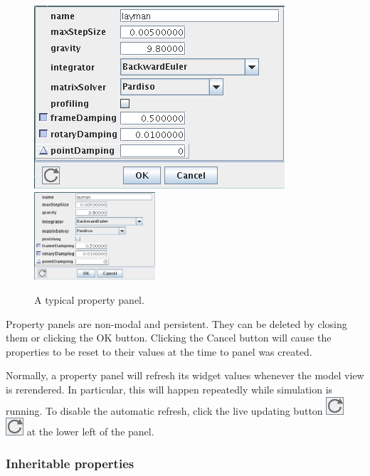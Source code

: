 \documentclass{article}
\begin{document}
\begin{figure}
\begin{center}
\iflatexml
\includegraphics[]{images/propertyPanel}
\else
\includegraphics[width=0.40\textwidth]{images/propertyPanel}
\fi
\end{center}
\caption{A typical property panel.}%
\label{propertyPanelFig}
\end{figure}

Property panels are non-modal and persistent. 
They can be deleted by
closing them or clicking the {\sf OK} button. Clicking the {\sf Cancel} button
will cause the properties to be reset to their values at the time to
panel was created.

Normally, a property panel will refresh its widget values whenever the
model view is rerendered. In particular, this will happen repeatedly
while simulation is running. To disable the automatic refresh, click
the {\sf live updating} button 
\iflatexml
\includegraphics{images/liveUpdateIcon}
\else
\includegraphics[width=.25in]{images/liveUpdateIcon}
\fi
at the lower
left of the panel.

\subsubsection{Inheritable properties}
\end{document}
